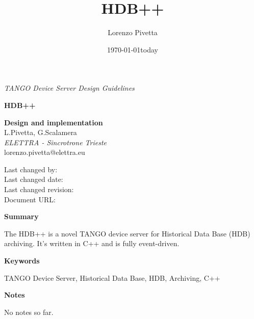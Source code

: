 \documentclass[11pt,a4paper]{article}
\title{HDB++}
\author{Lorenzo Pivetta}
\date{\today}
\def \hdb{HDB++}
\def \tango{TANGO}
\begin{document}

\thispagestyle{empty}
\begin{center}
	\hspace{1.5cm}
	\emph{\tango{} Device Server Design Guidelines}
	\vspace{2cm}
	\newline
	\begin{LARGE}
		\textbf{\hdb} \\
	\end{LARGE}
	\vspace{1cm}
	\textbf{Design and implementation} \\
	\vspace{2cm}
	L.Pivetta, G.Scalamera \\
	\emph{ELETTRA - Sincrotrone Trieste} \\
	\vspace{1cm}
	lorenzo.pivetta@elettra.eu \\
	\date{today}
	\vspace{10cm}
	Last changed by: \svnFullAuthor{\svnauthor} \\
	Last changed date: \svndate \\
	Last changed revision: \svnrev \\
	Document URL: \svnmainurl \\
\end{center}

\newpage

\begin{Large}
	\textbf{Summary}
\end{Large}
\newline
The \hdb{} is a novel \tango{} device server for Historical Data Base
(HDB) archiving. It's written in C++ and is fully event-driven.
\vspace{2cm}

\begin{Large}
	\textbf{Keywords}
\end{Large}
\newline
\tango{} Device Server, Historical Data Base, HDB, Archiving, C++
\vspace{2cm}
	
\begin{Large}
	\textbf{Notes}
\end{Large}
\newline
No notes so far.
\vspace{2cm}
\end{document}
